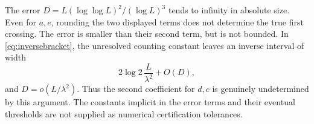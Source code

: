 The error $D=L(\log\log L)^2/(\log L)^3$ tends to infinity in absolute size. Even for $a,e$, rounding the two displayed terms does not determine the true first crossing. The error is smaller than their second term, but is not bounded. In \eqref{eq:inversebracket}, the unresolved counting constant leaves an inverse interval of width
\[
 2\log2\,\frac L{\lambda^2}+O(D),
\]
and $D=o(L/\lambda^2)$. Thus the second coefficient for $d,c$ is genuinely undetermined by this argument. The constants implicit in the error terms and their eventual thresholds are not supplied as numerical certification tolerances.
